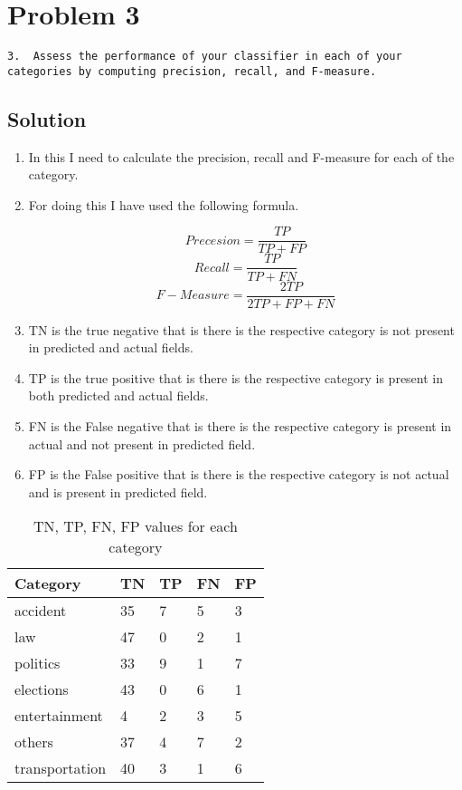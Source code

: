\section{Problem 3}
\label{part3}
\begin{verbatim}
3.  Assess the performance of your classifier in each of your
categories by computing precision, recall, and F-measure.  
\end{verbatim}
\subsection{Solution}
\begin{enumerate}

\item In this I need to calculate the precision, recall and F-measure for each of the category.
\item For doing this I have used the following formula. 

\[Precesion = \frac{TP}{TP + FP} \]
\[Recall = \frac{TP}{TP + FN} \]
\[F-Measure = \frac {2TP} {2TP+FP+FN} \]


\item TN is the true negative that is there is the respective category is not present in predicted and actual fields.
\item TP is the true positive that is there is the respective category is present in both predicted and actual fields.
\item FN is the False negative that is there is the respective category is present in actual and not present in predicted field.
\item FP is the False positive that is there is the respective category is not actual and is present in predicted field.

\newpage
\end{enumerate}

\begin{table}
\begin{tabular}{ | p{3.3cm} | p{1.5cm} | p{1.5cm} | p{1.5cm} | p{1.5cm}|}
\hline
\textbf{Category} & \textbf{TN} & \textbf{TP} & \textbf{FN} & \textbf{FP}  \\
\hline
accident & 35 & 7 & 5 & 3 \\
\hline
law & 47 & 0 & 2 & 1 \\
\hline
politics & 33 & 9 & 1 & 7  \\
\hline
elections & 43 & 0 & 6 & 1 \\
\hline
entertainment & 4 & 2 & 3 & 5 \\
\hline
others & 37 & 4 & 7 & 2 \\
\hline
transportation & 40 & 3 & 1 & 6 \\
\hline
\end{tabular}
\caption{TN, TP, FN, FP values for each category}
\label{table:q3-1}
\end{table}
 
